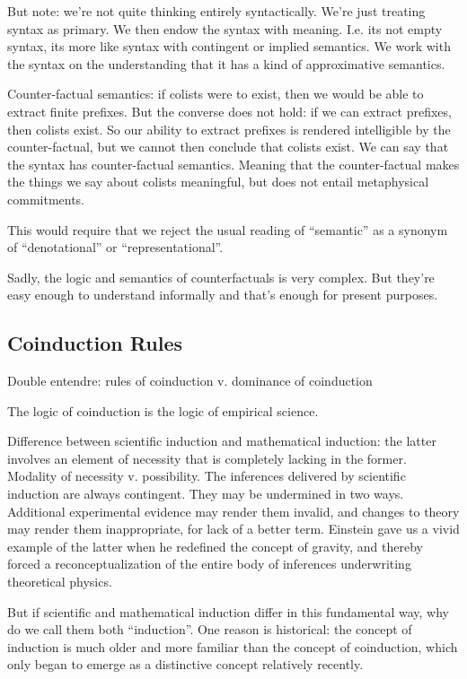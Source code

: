 \documentclass{article}
\begin{document}
But note: we're not quite thinking entirely syntactically. We're just
treating syntax as primary. We then endow the syntax with meaning.
I.e. its not empty syntax, its more like syntax with contingent or
implied semantics. We work with the syntax on the understanding that
it has a kind of approximative semantics.

Counter-factual semantics: if colists were to exist, then we would be
able to extract finite prefixes. But the converse does not hold: if we
can extract prefixes, then colists exist. So our ability to extract
prefixes is rendered intelligible by the counter-factual, but we
cannot then conclude that colists exist. We can say that the syntax
has counter-factual semantics. Meaning that the counter-factual makes
the things we say about colists meaningful, but does not entail
metaphysical commitments.

This would require that we reject the usual reading of ``semantic'' as a
synonym of ``denotational'' or ``representational''.

Sadly, the logic and semantics of counterfactuals is very complex. But
they're easy enough to understand informally and that's enough for
present purposes.

 \cite{sep-counterfactuals}



\subsection{Coinduction Rules}

Double entendre: rules of coinduction v. dominance of coinduction

The logic of coinduction is the logic of empirical science.

Difference between scientific induction and mathematical induction:
the latter involves an element of necessity that is completely lacking
in the former. Modality of necessity v. possibility. The inferences
delivered by scientific induction are always contingent. They may be
undermined in two ways. Additional experimental evidence may render
them invalid, and changes to theory may render them inappropriate, for
lack of a better term. Einstein gave us a vivid example of the latter
when he redefined the concept of gravity, and thereby forced a
reconceptualization of the entire body of inferences underwriting
theoretical physics.

But if scientific and mathematical induction differ in this
fundamental way, why do we call them both ``induction''. One reason is
historical: the concept of induction is much older and more familiar
than the concept of coinduction, which only began to emerge as a
distinctive concept relatively recently.
\end{document}
